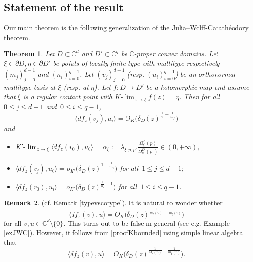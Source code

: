 \documentclass[11pt, reqno]{amsart}
\numberwithin{equation}{section}
\newtheorem{theorem}{Theorem}[section]
\theoremstyle{definition}
\newtheorem{remark}[theorem]{Remark}
\newcommand{\C}{\mathbb{C}}
\begin{document}
{{{		\subsection{Statement of the result}
		Our main theorem is the following generalization of the Julia--Wolff-Carath\'eodory theorem.
		\begin{theorem}\label{genJWC}
			Let $D\subset\C^d$ and $D'\subset\C^{q}$ be  $\C$-proper convex domains.
			Let $\xi\in\partial D,\eta\in \partial D'$ be points of locally finite type with multitype respectively $(m_j)_{j=0}^{d-1}$ and $(n_i)_{i=0}^{q-1}$.
			Let $(v_j)_{j=0}^{d-1}$ (resp. $(u_i)_{i=0}^{q-1}$) be an orthonormal  multitype basis at $\xi$ (resp. at $\eta$). 
			Let  $f\colon D\to D'$ be a holomorphic map and assume that $\xi$ is a regular contact point with $K\textrm{-}\lim_{z\to\xi}f(z)=\eta$.
			Then for all\, $0\leq j \leq d-1$ and \,$0\leq i\leq q-1$,
			\begin{equation}\label{proofKbounded}
				\langle df_z(v_j),u_i\rangle=O_K\biggl( \delta_D(z)^{\frac{1}{n_i}-\frac{1}{m_j}}\biggr)
			\end{equation}
			and
			\begin{itemize}
				\item[(i)] $K'\textrm{-}\lim_{z\to\xi}\langle df_z(v_0),u_0\rangle=\alpha_\xi:=\lambda_{\xi,p,p'}\frac{\Omega^D_\xi(p)}{\Omega^{D'}_\eta(p')}\in (0,+\infty)$;
				\item[(ii)] 
				$\langle df_z(v_j),u_0\rangle=o_{ K'}\biggl(\delta_D(z)^{1-\frac{1}{m_j}}\biggr)$ for all\,  $1\leq j\leq  d-1$;
				\item[(iii)] 
				$ \langle df_z(v_0),u_i\rangle=o_{ K'}\biggl(\delta_D(z)^{\frac{1}{n_i}-1}\biggr)$  for all\, $1\leq i\leq  q-1$.
			\end{itemize}
		\end{theorem}
		
		
		
		\begin{remark}\label{JWCcorretta} (cf. Remark \ref{typevscotype}). It is  natural to wonder whether 
			\begin{equation}\label{formulafalsa}
				\langle df_z(v),u\rangle=O_K \biggl(\delta_D(z)^{\frac{1}{m_\eta(u)}-\frac{1}{m_\xi(v)}}\biggr)
			\end{equation}
			for all $v,u\in \C^d\setminus\{0\}$. This turns out to be false in general (see e.g. Example \ref{exJWC}). However, it follows from \eqref{proofKbounded} using simple linear algebra that
			$$\langle df_z(v),u\rangle=O_K \biggl(\delta_D(z)^{\frac{1}{M_\eta(u)}-\frac{1}{m_\xi(v)}}\biggr).$$
			

\end{remark}}}}
\end{document}
